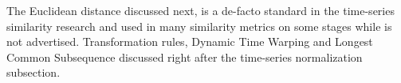 The Euclidean distance discussed next, is a de-facto standard in the time-series similarity research and used in many similarity metrics on some stages while is not advertised. Transformation rules, Dynamic Time Warping and Longest Common Subsequence discussed right after the time-series normalization subsection.
